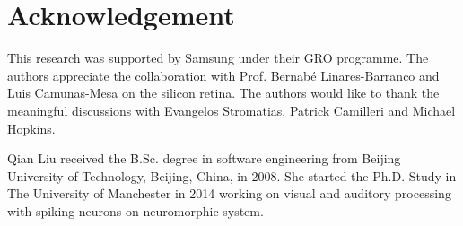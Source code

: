 \documentclass[journal]{journal}
\begin{document}
\section{Acknowledgement}
This research was supported by Samsung under their GRO programme.
The authors appreciate the collaboration with Prof. Bernab{\'e} Linares-Barranco and Luis Camunas-Mesa on the silicon retina.
The authors would like to thank the meaningful discussions with Evangelos Stromatias, Patrick Camilleri and Michael Hopkins.


\begin{IEEEbiography}{Qian Liu}
received the B.Sc. degree in
software engineering from Beijing University of Technology, Beijing, China, in 2008.
She started the Ph.D. Study in The University of Manchester in 2014 working on visual and auditory processing with spiking neurons on neuromorphic system.
\end{IEEEbiography}
\end{document}
